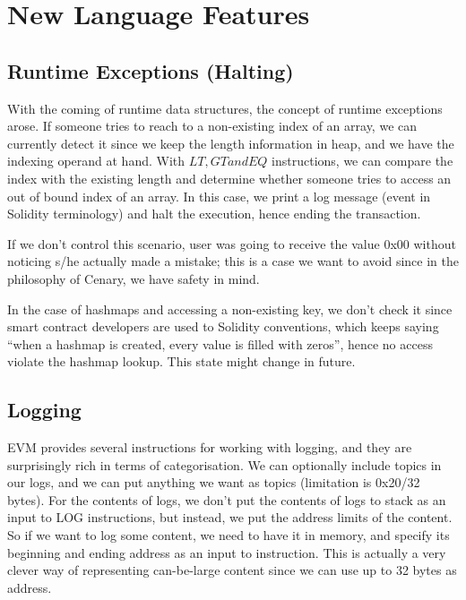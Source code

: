 \documentclass{article}
\begin{document}
\section{New Language Features}
\label{new-language-features}
\subsection{Runtime Exceptions (Halting)}
With the coming of runtime data structures, the concept of runtime exceptions arose. If someone tries to reach to a non-existing index of an array, we can currently detect it since we keep the length information in heap, and we have the indexing operand at hand. With $LT, GT and EQ$ instructions, we can compare the index with the existing length and determine whether someone tries to access an out of bound index of an array. In this case, we print a log message (event in Solidity terminology) and halt the execution, hence ending the transaction.

\par If we don't control this scenario, user was going to receive the value 0x00 without noticing s/he actually made a mistake; this is a case we want to avoid since in the philosophy of Cenary, we have safety in mind.

\par In the case of hashmaps and accessing a non-existing key, we don't check it since smart contract developers are used to Solidity conventions, which keeps saying ``when a hashmap is created, every value is filled with zeros'', hence no access violate the hashmap lookup. This state might change in future.
\label{runtime-exceptions}
\newpage
\subsection{Logging}
\label{logging}
\par EVM provides several instructions for working with logging, and they are surprisingly rich in terms of categorisation. We can optionally include topics in our logs, and we can put anything we want as topics (limitation is 0x20/32 bytes). For the contents of logs, we don't put the contents of logs to stack as an input to LOG instructions, but instead, we put the address limits of the content. So if we want to log some content, we need to have it in memory, and specify its beginning and ending address as an input to instruction. This is actually a very clever way of representing can-be-large content since we can use up to 32 bytes as address.
\end{document}
